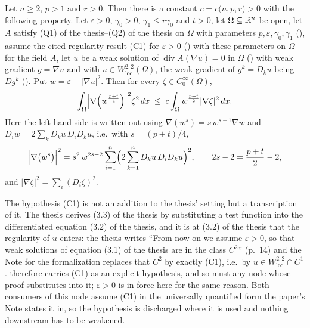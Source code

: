 \begin{helper}[Inequality (3.3)]
Let $n\ge2$, $p>1$ and $r>0$.  Then there is a constant
$c=c\bigl(n,p,r\bigr)>0$ with the following property.  Let
$\varepsilon>0$, $\gamma_0>0$, $\gamma_1\le r\gamma_0$ and $t>0$, let
$\Omega\subseteq\mathbb{R}^n$ be open, let $A$ satisfy (Q1) of the thesis--(Q2) of the thesis on
$\Omega$ with parameters $p,\varepsilon,\gamma_0,\gamma_1$
(), assume the cited regularity result (C1) for
$\varepsilon>0$ () with these parameters on
$\Omega$ for the field $A$, let $u$ be a weak solution of
$\operatorname{div}A(\nabla u)=0$ in $\Omega$ () with
weak gradient $g=\nabla u$ and with $u\in W^{2,2}_{\mathrm{loc}}(\Omega)$, the
weak gradient of $g^k=D_ku$ being $Dg^k$ ().  Put
$w=\varepsilon+|\nabla u|^2$.  Then for every $\zeta\in C_0^\infty(\Omega)$,
\[
\int_\Omega\Bigl|\nabla\Bigl(w^{\frac{p+t}4}\Bigr)\Bigr|^2\zeta^2\,dx
\;\le\;c\int_\Omega w^{\frac{p+t}2}|\nabla\zeta|^2\,dx .
\]
Here the left-hand side is written out using
$\nabla(w^{s})=s\,w^{s-1}\nabla w$ and
$D_iw=2\sum_k D_ku\,D_iD_ku$, i.e.\ with $s=(p+t)/4$,
\[
\Bigl|\nabla\bigl(w^{s}\bigr)\Bigr|^{2}
=s^{2}\,w^{2s-2}\sum_{i=1}^n\Bigl(2\sum_{k=1}^nD_ku\,D_iD_ku\Bigr)^{2},
\qquad 2s-2=\frac{p+t}2-2 ,
\]
and $|\nabla\zeta|^2=\sum_i(D_i\zeta)^2$.

The hypothesis (C1) is not an addition to the thesis' setting but a transcription
of it.  The thesis derives (3.3) of the thesis by substituting a test function into
the differentiated equation (3.2) of the thesis, and it is at
(3.2) of the thesis that the regularity of $u$ enters: the thesis writes ``From now on
we assume $\varepsilon>0$, so that weak solutions of equation (3.1) of the thesis are
in the class $C^2$'' (p.~14) and the Note for the formalization replaces that
$C^2$ by exactly (C1), i.e.\ by $u\in W^{2,2}_{\mathrm{loc}}\cap C^1$.
 therefore carries (C1) as an explicit
hypothesis, and so must any node whose proof substitutes into it;
$\varepsilon>0$ is in force here for the same reason.  Both consumers of this
node assume (C1) in the universally quantified form the paper's Note states it
in, so the hypothesis is discharged where it is used and nothing downstream has
to be weakened.
\end{helper}
